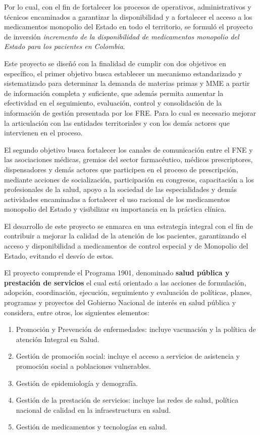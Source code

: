 \documentclass[
]{book}
\begin{document}
Por lo cual, con el fin de fortalecer los procesos de operativos, administrativos y técnicos encaminados a garantizar la disponibilidad y a fortalecer el acceso a los medicamentos monopolio del Estado en todo el territorio, se formuló el proyecto de inversión \emph{incremento de la disponibilidad de medicamentos monopolio del Estado para los pacientes en Colombia}.

Este proyecto se diseñó con la finalidad de cumplir con dos objetivos en específico, el primer objetivo busca establecer un mecanismo estandarizado y sistematizado para determinar la demanda de materias primas y MME a partir de información completa y suficiente, que además permita aumentar la efectividad en el seguimiento, evaluación, control y consolidación de la información de gestión presentada por los FRE. Para lo cual es necesario mejorar la articulación con las entidades territoriales y con los demás actores que intervienen en el proceso.

El segundo objetivo busca fortalecer los canales de comunicación entre el FNE y las asociaciones médicas, gremios del sector farmacéutico, médicos prescriptores, dispensadores y demás actores que participen en el proceso de prescripción, mediante acciones de socialización, participación en congresos, capacitación a los profesionales de la salud, apoyo a la sociedad de las especialidades y demás actividades encaminadas a fortalecer el uso racional de los medicamentos monopolio del Estado y visibilizar su importancia en la práctica clínica.

El desarrollo de este proyecto se enmarca en una estrategia integral con el fin de contribuir a mejorar la calidad de la atención de los pacientes, garantizando el acceso y disponibilidad a medicamentos de control especial y de Monopolio del Estado, evitando el desvío de estos.

El proyecto comprende el Programa 1901, denominado \textbf{salud pública y prestación de servicios} el cual está orientado a las acciones de formulación, adopción, coordinación, ejecución, seguimiento y evaluación de políticas, planes, programas y proyectos del Gobierno Nacional de interés en salud pública y considera, entre otros, los siguientes elementos:

\begin{enumerate}
\def\labelenumi{\arabic{enumi}.}
\item
  Promoción y Prevención de enfermedades: incluye vacunación y la política de atención Integral en Salud.
\item
  Gestión de promoción social: incluye el acceso a servicios de asistencia y promoción social a poblaciones vulnerables.
\item
  Gestión de epidemiología y demografía.
\item
  Gestión de la prestación de servicios: incluye las redes de salud, política nacional de calidad en la infraestructura en salud.
\item
  Gestión de medicamentos y tecnologías en salud.
\end{enumerate}
\end{document}
